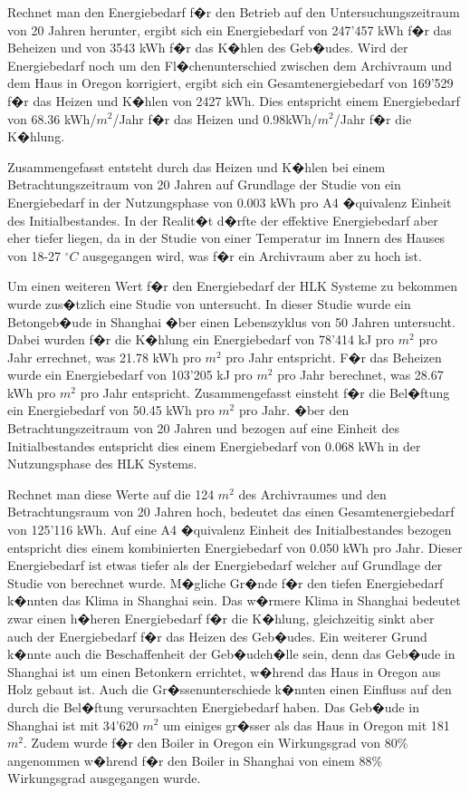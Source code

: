 \documentclass[a4paper,twoside,10pt]{report}
\begin{document}
Rechnet man den Energiebedarf f�r den Betrieb auf den Untersuchungszeitraum von 20 Jahren herunter, ergibt sich ein Energiebedarf von 247'457 kWh f�r das Beheizen und von 3543 kWh f�r das K�hlen des Geb�udes. Wird der Energiebedarf noch um den Fl�chenunterschied zwischen dem Archivraum und dem Haus in Oregon korrigiert, ergibt sich ein Gesamtenergiebedarf von 169'529 f�r das Heizen und K�hlen von 2427 kWh. Dies entspricht einem Energiebedarf von 68.36 kWh/$m^2$/Jahr f�r das Heizen und 0.98kWh/$m^2$/Jahr f�r die K�hlung. \cite{hvac_1}

Zusammengefasst entsteht durch das Heizen und K�hlen bei einem Betrachtungszeitraum von 20 Jahren auf Grundlage der Studie von \citeauthor{hvac_1} ein Energiebedarf in der Nutzungsphase von 0.003 kWh pro A4 �quivalenz Einheit des Initialbestandes. In der Realit�t d�rfte der effektive Energiebedarf aber eher tiefer liegen, da in der Studie von einer Temperatur im Innern des Hauses von 18-27 $^{\circ}C$ ausgegangen wird, was f�r ein Archivraum aber zu hoch ist.

Um einen weiteren Wert f�r den Energiebedarf der \ac{HLK} Systeme zu bekommen wurde zus�tzlich eine Studie von \citeauthor{lca_build} untersucht. In dieser Studie wurde ein Betongeb�ude in Shanghai �ber einen Lebenszyklus von 50 Jahren untersucht. Dabei wurden f�r die K�hlung ein Energiebedarf von 78'414 kJ pro $m^2$ pro Jahr errechnet, was 21.78 kWh pro $m^2$ pro Jahr entspricht. F�r das Beheizen wurde ein Energiebedarf von 103'205 kJ pro $m^2$ pro Jahr berechnet, was 28.67 kWh pro $m^2$ pro Jahr entspricht. Zusammengefasst einsteht f�r die Bel�ftung ein Energiebedarf von 50.45 kWh pro $m^2$ pro Jahr. �ber den Betrachtungszeitraum von 20 Jahren und bezogen auf eine Einheit des Initialbestandes entspricht dies einem Energiebedarf von 0.068 kWh in der Nutzungsphase des \ac{HLK} Systems. \cite{lca_build}

Rechnet man diese Werte auf die 124 $m^2$ des Archivraumes und den Betrachtungsraum von 20 Jahren hoch, bedeutet das einen Gesamtenergiebedarf von 125'116 kWh. Auf eine A4 �quivalenz Einheit des Initialbestandes bezogen entspricht dies einem kombinierten Energiebedarf von 0.050 kWh pro Jahr. Dieser Energiebedarf ist etwas tiefer als der Energiebedarf welcher auf Grundlage der Studie von \citeauthor{hvac_1} berechnet wurde. M�gliche Gr�nde f�r den tiefen Energiebedarf k�nnten das Klima in Shanghai sein. Das w�rmere Klima in Shanghai bedeutet zwar einen h�heren Energiebedarf f�r die K�hlung, gleichzeitig sinkt aber auch der Energiebedarf f�r das Heizen des Geb�udes. Ein weiterer Grund k�nnte auch die Beschaffenheit der Geb�udeh�lle sein, denn das Geb�ude in Shanghai ist um einen Betonkern errichtet, w�hrend das Haus in Oregon aus Holz gebaut ist. Auch die Gr�ssenunterschiede k�nnten einen Einfluss auf den durch die Bel�ftung verursachten Energiebedarf haben. Das Geb�ude in Shanghai ist mit 34'620 $m^2$ um einiges gr�sser als das Haus in Oregon mit 181 $m^2$. Zudem wurde f�r den Boiler in Oregon ein Wirkungsgrad von 80\% angenommen w�hrend f�r den Boiler in Shanghai von einem 88\% Wirkungsgrad ausgegangen wurde.
\end{document}
